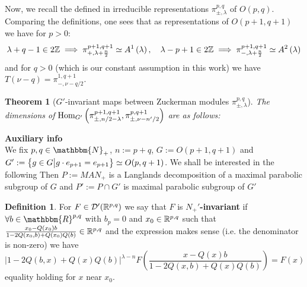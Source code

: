 \documentclass[10pt]{article} %
\newcommand{\assign}{:=}
\newtheorem{theorem}{Theorem}
\newcommand{\Hom}{\mbox{\normalfont Hom}}
\theoremstyle{definition}
\newtheorem{definition}{Definition}
\newcommand{\tmtextbf}[1]{{\bfseries{#1}}}
\begin{document}
Now, we recall the defined in \cite{KO2} irreducible representations $\pi_{\pm,\lambda}^{p,q}$ of $O(p,q)$. Comparing the definitions, one sees that as 
representations of $O(p+1,q+1)$ we have for $p>0$:
\begin{equation*}
	\lambda+q-1\in2\mathbb{Z}\implies\pi_{+,\lambda+\frac{n}{2}}^{p+1,q+1}\simeq A^1\left(\lambda  \right),\quad\lambda-p+1\in2\mathbb{Z}\implies\pi_{-,\lambda+\frac{n}{2} }^{p+1,q+1}\simeq A^2\left(\lambda\right)
\end{equation*}
and for $q>0$ (which is our constant assumption in this work) we have $T(\nu-q)=\pi_{-,\nu-q/2}^{1,q+1}$.

\begin{theorem}[$G'$-invariant maps between Zuckerman modules $\pi_{\pm,\lambda}^{p,q}$]
	The dimensions of $\Hom_{G'}\left(\pi_{\pm,{n}/{2}-\lambda}^{p+1,q+1} ,\pi_{\pm,\nu-{n'}/{2}}^{p,q+1} \right)$
	are as follows:\newline
{}
\end{theorem}

\newpage
\noindent\textbf{\large Auxiliary info}\\
We fix $p, q \in \mathbbm{N}_+$, $n \assign p + q$, $G \assign O (p +
1, q + 1)$ and $G' \assign \mysetn{g \in
G}{g \cdot e_{p + 1} = e_{p + 1}} \simeq O (p, q + 1)$. We shall be interested
in the following
Then $P:=MAN_{+}$ is a Langlands decomposition of a maximal parabolic subgroup of $G$
and $P':=P\cap G'$ is maximal parabolic subgroup of $G'$
\begin{definition}
	\label{def1}For $F \in \mathcal{D}' (\mathbb{R}^{p,q})$
  we say that $F$ is
  \tmtextbf{$N_+'$-invariant} if $\forall b \in \mathbbm{R}^{p, q}$
  with $b_p = 0$ and $x_0 \in \mathbb{R}^{p,q}$ such that $\frac{x_0 - Q (x_0) b}{1 - 2 Q
  (x_0, b) + Q (x_0) Q (b)} \in \mathbb{R}^{p,q}$ and the expression makes sense (i.e. the
  denominator is non-zero) we have
  \begin{equation*}
    \label{eq-Nequiv} | 1 - 2 Q (b, x) + Q (x) Q (b) |^{\lambda - n} F \left(
    \frac{x - Q (x) b}{1 - 2 Q (x, b) + Q (x) Q (b)} \right) = F (x)
  \end{equation*}
  equality holding for $x$ near $x_0$.
\end{definition}
\end{document}
